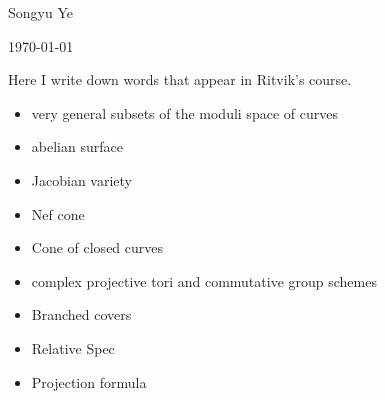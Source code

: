 \documentclass[12pt]{article}
\begin{document}
Songyu Ye

\today

\hfill

Here I write down words that appear in Ritvik's course.

\begin{itemize}
    \item very general subsets of the moduli space of curves
    \item abelian surface
    \item Jacobian variety
    \item Nef cone
    \item Cone of closed curves
    \item complex projective tori and commutative group schemes
    \item Branched covers
    \item Relative Spec
    \item Projection formula
\end{itemize}
\end{document}
